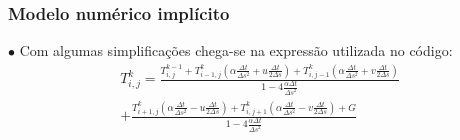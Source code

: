 \documentclass[xcolor=dvipsnames,10pt,aspectratio=169]{beamer}
\begin{document}
	\begin{frame} 
		\frametitle{Modelo numérico implícito}
		$\bullet$ Com algumas simplificações chega-se na expressão utilizada no código:
		\begin{equation}
			\begin{split}
			T_{i,j}^{k} = \frac{T_{i,j}^{k-1} + T_{i -1, j}^{k} \left( \alpha \frac{\Delta t}{\Delta s^2} + u \frac{\Delta t}{2 \Delta s} \right) 	+ T_{i,j-1}^{k} \left( \alpha \frac{\Delta t}{\Delta s^2} + v \frac{\Delta t}{2 \Delta s} \right)}{ 1 - 4 \frac{\alpha \Delta t}{\Delta s ^2}} \\
			+ \frac{  T_{i+1,j}^{k} \left( \alpha \frac{\Delta t}{ \Delta s^2} - u \frac{\Delta t}{2 \Delta s}\right) 
			+  T_{i,j+1}^{k} \left( \alpha \frac{\Delta t}{\Delta s^2} - v \frac{\Delta t}{2 \Delta s}\right) + G}{ 1 - 4 \frac{\alpha \Delta t}{\Delta s ^2}}
			\end{split}
		\end{equation}
	\end{frame}
\end{document}
